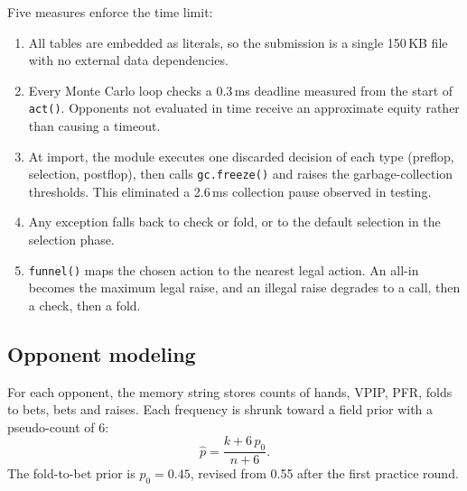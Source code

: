 \documentclass[10pt]{article}
\begin{document}
Five measures enforce the time limit:
\begin{enumerate}[label=(\roman*)]
\item All tables are embedded as literals, so the submission is a single 150\,KB file with no external data dependencies.
\item Every Monte Carlo loop checks a 0.3\,ms deadline measured from the start of \texttt{act()}. Opponents not evaluated in time receive an approximate equity rather than causing a timeout.
\item At import, the module executes one discarded decision of each type (preflop, selection, postflop), then calls \texttt{gc.freeze()} and raises the garbage-collection thresholds. This eliminated a 2.6\,ms collection pause observed in testing.
\item Any exception falls back to check or fold, or to the default selection in the selection phase.
\item \texttt{funnel()} maps the chosen action to the nearest legal action. An all-in becomes the maximum legal raise, and an illegal raise degrades to a call, then a check, then a fold.
\end{enumerate}

\subsection{Opponent modeling}
For each opponent, the memory string stores counts of hands, VPIP, PFR, folds to bets, bets and raises. Each frequency is shrunk toward a field prior with a pseudo-count of 6:
\[
\hat p=\frac{k+6\,p_0}{n+6}.
\]
The fold-to-bet prior is $p_0=0.45$, revised from 0.55 after the first practice round.
\end{document}
